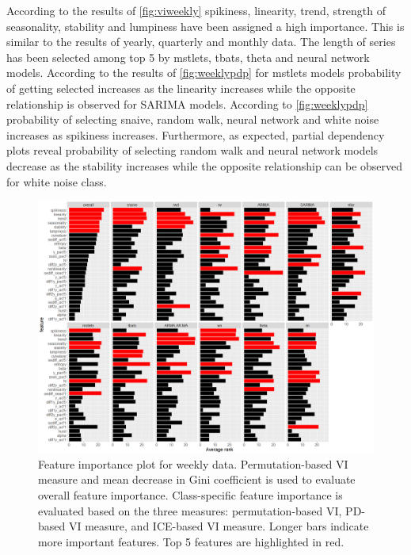 \documentclass[11pt,a4paper,]{article}
\begin{document}
According to the results of \autoref{fig:viweekly} spikiness, linearity,
trend, strength of seasonality, stability and lumpiness have been
assigned a high importance. This is similar to the results of yearly,
quarterly and monthly data. The length of series has been selected among
top 5 by mstlets, tbats, theta and neural network models. According to
the results of \autoref{fig:weeklypdp} for mstlets models probability of
getting selected increases as the linearity increases while the opposite
relationship is observed for SARIMA models. According to
\autoref{fig:weeklypdp} probability of selecting snaive, random walk,
neural network and white noise increases as spikiness increases.
Furthermore, as expected, partial dependency plots reveal probability of
selecting random walk and neural network models decrease as the
stability increases while the opposite relationship can be observed for
white noise class.

\begin{figure}[h]

{\centering \includegraphics{figures/viweekly-1} 

}

\caption{Feature importance plot for weekly data. Permutation-based VI measure and mean decrease in Gini coefficient is used to evaluate overall feature importance. Class-specific feature importance is evaluated based on the three measures: permutation-based VI, PD-based VI measure, and ICE-based VI measure. Longer bars indicate more important features. Top 5 features are highlighted in red.}\label{fig:viweekly}
\end{figure}
\end{document}
